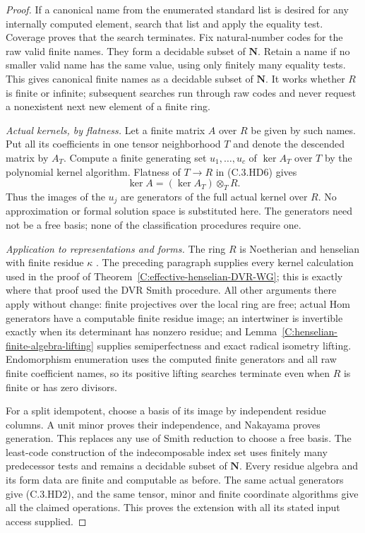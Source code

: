 \begin{proof}
If a canonical name from the enumerated standard
list is desired for any internally computed element,
search that list and apply the equality test.
Coverage proves that the search terminates.
Fix natural-number codes for the raw valid finite
names.  They form a decidable subset of $\mathbf N$.
Retain a name if no smaller valid name has the same
value, using only finitely many equality tests.
This gives canonical finite names as a decidable
subset of $\mathbf N$.  It works whether $R$ is
finite or infinite; subsequent searches run through
raw codes and never request a nonexistent next
new element of a finite ring.

\emph{Actual kernels, by flatness.}
Let a finite matrix $A$ over $R$ be given by such
names.  Put all its coefficients in one tensor
neighborhood $T$ and denote the descended matrix
by $A_T$.  Compute a finite generating set
$u_1,\ldots,u_c$ of $\ker A_T$ over $T$ by the
polynomial kernel algorithm.
Flatness of $T\to R$ in (C.3.HD6) gives
\[
            \ker A=(\ker A_T)\otimes_T R.
\]
Thus the images of the $u_j$ are generators of
the full actual kernel over $R$.  No approximation
or formal solution space is substituted here.
The generators need not be a free basis; none
of the classification procedures require one.

\emph{Application to representations and forms.}
The ring $R$ is Noetherian and henselian with finite
residue $\kappa$
\cite[Lemma 15.46.3, Tag 06LJ]{C-StacksHenselianEffective}.
The preceding paragraph supplies every kernel
calculation used in the proof of
Theorem~\ref{C:effective-henselian-DVR-WG}; this is
exactly where that proof used the DVR Smith procedure.
All other arguments there apply without change:
finite projectives over the local ring are free;
actual Hom generators have a computable finite
residue image; an intertwiner is invertible exactly
when its determinant has nonzero residue; and
Lemma~\ref{C:henselian-finite-algebra-lifting} supplies
semiperfectness and exact radical isometry lifting.
Endomorphism enumeration uses the computed finite
generators and all raw finite coefficient names,
so its positive lifting searches terminate even
when $R$ is finite or has zero divisors.

For a split idempotent, choose a basis of its
image by independent residue columns.  A unit
minor proves their independence, and Nakayama
proves generation.  This replaces any use of
Smith reduction to choose a free basis.
The least-code construction of the indecomposable
index set uses finitely many predecessor tests
and remains a decidable subset of $\mathbf N$.
Every residue algebra and its form data are
finite and computable as before.  The same actual
generators give (C.3.HD2), and the same tensor,
minor and finite coordinate algorithms give
all the claimed operations.  This proves the
extension with all its stated input access supplied.
\end{proof}
